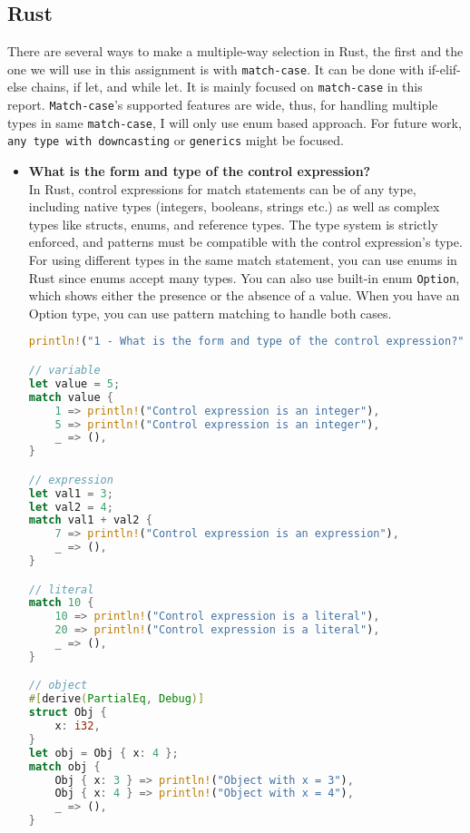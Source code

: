 \documentclass{article}
\begin{document}
\subsection{Rust}

There are several ways to make a multiple-way selection in Rust, the first and the one we will use in this assignment is with \texttt{match-case}. It can be done with if-elif-else chains, if let, and while let. It is mainly focused on \texttt{match-case} in this report. \texttt{Match-case}'s supported features are wide, thus, for handling multiple types in same \texttt{match-case}, I will only use enum based approach. For future work, \texttt{any type with downcasting} or \texttt{generics} might be focused.


\begin{itemize}
\item \textbf{What is the form and type of the control expression?} \\

In Rust, control expressions for match statements can be of any type, including native types (integers, booleans, strings etc.) as well as complex types like structs, enums, and reference types. The type system is strictly enforced, and patterns must be compatible with the control expression's type. For using different types in the same match statement, you can use enums in Rust since enums accept many types. You can also use built-in enum \texttt{Option}, which shows either the presence or the absence of a value. When you have an Option type, you can use pattern matching to handle both cases.
\begin{lstlisting}[language=Rust]
println!("1 - What is the form and type of the control expression?");

// variable
let value = 5;
match value {
    1 => println!("Control expression is an integer"),
    5 => println!("Control expression is an integer"),
    _ => (),
}

// expression
let val1 = 3;
let val2 = 4;
match val1 + val2 {
    7 => println!("Control expression is an expression"),
    _ => (),
}

// literal
match 10 {
    10 => println!("Control expression is a literal"),
    20 => println!("Control expression is a literal"),
    _ => (),
}

// object
#[derive(PartialEq, Debug)]
struct Obj {
    x: i32,
}
let obj = Obj { x: 4 };
match obj {
    Obj { x: 3 } => println!("Object with x = 3"),
    Obj { x: 4 } => println!("Object with x = 4"),
    _ => (),
}


\end{lstlisting}
\end{itemize}
\end{document}
